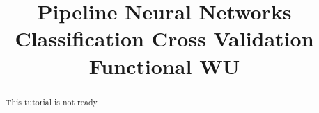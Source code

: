 \documentclass[justified]{tufte-handout}
\title{Pipeline Neural Networks Classification Cross Validation Functional WU}
\begin{document}
\maketitle

\begin{abstract}
\noindent
This tutorial is not ready.
\end{abstract}
\end{document}
